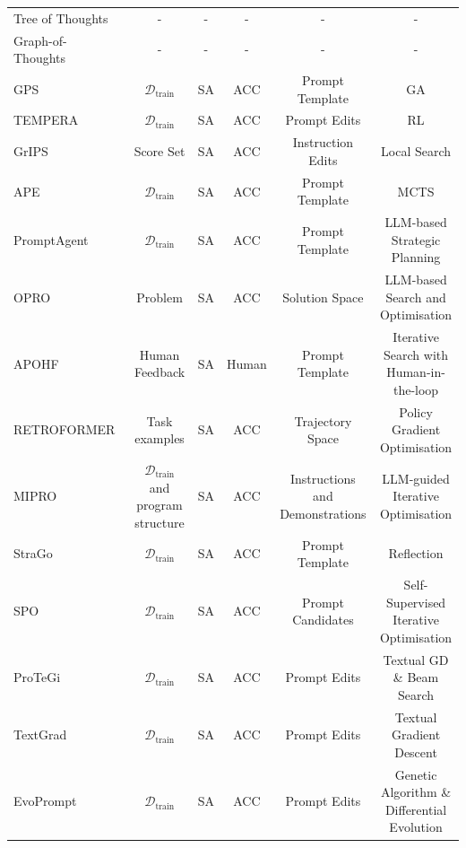 \begin{table}[t]
{\begin{tabular}{lccccc}
        Tree of Thoughts~\citep{yao2023tree}& - & - & - & - & - \\

        Graph-of-Thoughts~\citep{besta2024graph}& - & - & - & - & - \\


        GPS~\citep{xu2022gps} & $\mathcal{D}_{\text{train}}$ & SA & ACC & Prompt Template & GA \\
        TEMPERA~\citep{zhang2023tempera} & $\mathcal{D}_{\text{train}}$ & SA & ACC & Prompt Edits & RL \\
        GrIPS~\citep{prasad2023grips} & Score Set & SA & ACC & Instruction Edits & Local Search \\
        APE~\citep{zhou2023large} & $\mathcal{D}_{\text{train}}$ & SA & ACC & Prompt Template & MCTS \\
        
        PromptAgent~\citep{wang2024promptagent} & $\mathcal{D}_{\text{train}}$ & SA & ACC & Prompt Template & LLM-based Strategic Planning \\
        OPRO~\citep{yang2024large} & Problem & SA & ACC & Solution Space & LLM-based Search and Optimisation \\
        APOHF~\citep{lin2024prompt} & Human Feedback & SA & Human & Prompt Template & Iterative Search with Human-in-the-loop \\
        RETROFORMER~\citep{yao2024retroformer} & Task examples & SA & ACC & Trajectory Space & Policy Gradient Optimisation \\
        MIPRO~\citep{opsahl2024optimizing} & $\mathcal{D}_{\text{train}}$ and program structure & SA & ACC & Instructions and Demonstrations & LLM-guided Iterative Optimisation \\
        StraGo~\citep{wu2024strago} & $\mathcal{D}_{\text{train}}$ & SA & ACC & Prompt Template & Reflection \\
        SPO~\citep{xiang2025self} & $\mathcal{D}_{\text{train}}$ & SA & ACC & Prompt Candidates & Self-Supervised Iterative Optimisation \\
        ProTeGi~\citep{pryzant2023automatic} & $\mathcal{D}_{\text{train}}$ & SA & ACC & Prompt Edits & Textual GD \& Beam Search \\
        TextGrad~\citep{yuksekgonul2024textgrad} & $\mathcal{D}_{\text{train}}$ & SA & ACC & Prompt Edits & Textual Gradient Descent \\
        EvoPrompt~\citep{guo2024evoprompt} & $\mathcal{D}_{\text{train}}$ & SA & ACC & Prompt Edits & Genetic Algorithm \& Differential Evolution \\


\end{tabular}}
\end{table}
